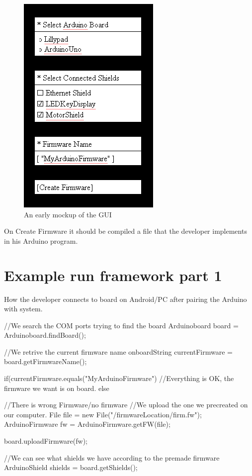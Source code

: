\begin{figure}
	\centering
	\includegraphics{./img/architecture-mockupgui.png}
	\caption{An early mockup of the GUI}
	\label{fig:architecture-mockupgui}
\end{figure}

On Create Firmware it should be compiled a file that the developer implements in his Arduino program.

\section{Example run framework part 1}

How the developer connects to board on Android/PC after pairing the Arduino with system.

//We search the COM ports trying to find the board
Arduinoboard board = Arduinoboard.findBoard();

//We retrive the current firmware name onboardString currentFirmware = board.getFirmwareName();

if(currentFirmware.equals("MyArduinoFirmware"){
    //Everything is OK, the firmware we want is on board.
}
else{
    //There is wrong Firmware/no firmware
    //We upload the one we precreated on our computer.
    File file = new File("/firmwareLocation/firm.fw");
    ArduinoFirmware fw = ArduinoFirmware.getFW(file);

    board.uploadFirmware(fw);
}

//We can see what shields we have according to the premade firmware
ArduinoShield shields = board.getShields();

